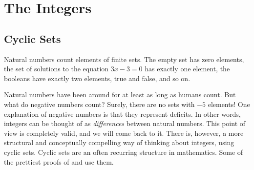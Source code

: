 \chapter{The Integers}

\section{Cyclic Sets}

Natural numbers count elements of finite sets. The empty set has zero elements, the set of solutions to the equation $3x-3=0$ has exactly one element, the booleans have exactly two elements, true and false, and so on.

Natural numbers have been around for at least as long as humans count. But what do negative numbers count? Surely, there are no sets with $-5$ elements! One explanation of negative numbers is that they represent deficits. In other words, integers can be thought of as \emph{differences} between natural numbers. This point of view is completely valid, and we will come back to it. There is, however, a more structural and conceptually compelling way of thinking about integers, using cyclic sets. Cyclic sets are an often recurring structure in mathematics. Some of the prettiest proofs of  and  use them.

